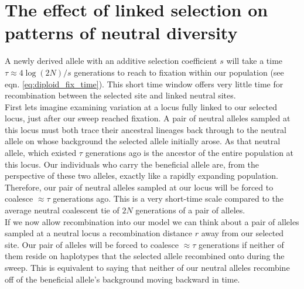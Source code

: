 \chapter{The effect of linked selection on patterns of neutral diversity}

A newly derived allele with an additive selection coefficient $s$ will
take a time $\tau \approx 4\log(2N)/s$ generations to reach to fixation
within our population (see eqn. \eqref{eq:diploid_fix_time}). This short time window offers very little time
for recombination between the selected site and linked neutral
sites.  \\

First lets imagine examining variation at a locus fully linked
to our selected locus, just after our sweep reached fixation. A pair of neutral alleles sampled at this locus
must both trace their ancestral lineages back through to the neutral
allele on whose background the selected allele initially arose. As
that neutral allele, which existed $\tau$ generations ago is the
ancestor of the entire population at this locus. Our individuals who
carry the beneficial allele are, from the perspective of these two
alleles, exactly like a rapidly expanding population. Therefore, our
pair of neutral alleles sampled at our locus will be forced to
coalesce $\approx \tau$ generations ago. This is a very
short-time scale compared to the average neutral coalescent tie of
$2N$ generations of a pair of alleles.\\

If we now allow recombination into our model we can think about a pair
of alleles sampled at a neutral locus a recombination distance $r$
away from our selected site. Our pair of alleles will be forced to
coalesce $\approx \tau$ generations if neither of them reside on
haplotypes that the selected allele recombined onto during the
sweep. This is equivalent to saying that neither of our neutral
alleles recombine off of the beneficial allele's background moving
backward in time.\\

